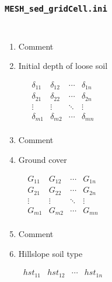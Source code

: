 \documentclass{beamer}
\newcounter{ResumeEnumerate}
\begin{document}
\begin{frame}
\end{frame}
\setcounter{ResumeEnumerate}{\value{enumi}}
\begin{frame}\frametitle{\texttt{MESH\_sed\_gridCell.ini}}
\begin{columns}
{\tiny
\begin{enumerate}[label=Line \arabic*]\itemsep0em 
\item Comment
\item Initial depth of loose soil\\[-2.7em]
\begin{minipage}[t]{0.1\linewidth}
$$
\begin{matrix} 
\delta_{11} & \delta_{12} & \cdots & \delta_{1n} \\
\delta_{21} & \delta_{22} & \cdots & \delta_{2n} \\
\vdots & \vdots & \ddots & \vdots \\
\delta_{m1} & \delta_{m2} & \cdots & \delta_{mn} \\
\end{matrix}
$$
\end{minipage}
\item Comment
\item Ground cover\\[-2.7em]
\begin{minipage}[t]{0.1\linewidth}
\begin{flushright}
$$
\begin{matrix} 
G_{11} & G_{12} & \cdots & G_{1n} \\
G_{21} & G_{22} & \cdots & G_{2n} \\
\vdots & \vdots & \ddots & \vdots \\
G_{m1} & G_{m2} & \cdots & G_{mn}\\
\end{matrix}
$$
\end{flushright}
\end{minipage}
\item Comment
\item Hillslope soil type\\[-2.7em]
\begin{minipage}[t]{0.1\linewidth}
\begin{flushright}
$$
\begin{matrix} 
hst_{11} & hst_{12} & \cdots & hst_{1n} \\

\end{matrix}$$
\end{flushright}
\end{minipage}
\end{enumerate}}
\end{columns}
\end{frame}
\end{document}
